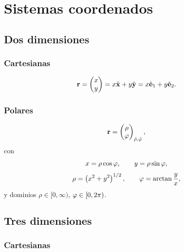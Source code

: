 \section{Sistemas coordenados}
\label{sec:sistemas_coordenados}

\subsection{Dos dimensiones}
\label{subsec:coordenadas_2d}

\subsubsection{Cartesianas}
\label{subsubsec:cartesianas_2d}

\begin{equation}
  \label{eq:cartesianas_2d}
  \mathbf{r}=
  \begin{pmatrix}
    x\\y
  \end{pmatrix}
  =x\hat{\mathbf{x}}+y\hat{\mathbf{y}}=x\hat{\mathbf{e}}_1+y\hat{\mathbf{e}}_2 .
\end{equation}

\subsubsection{Polares}
\label{subsubsec:polares}

\begin{equation}
  \label{eq:polares}
  \mathbf{r}=
  \begin{pmatrix}
    \rho\\\varphi
  \end{pmatrix}_{\hat{\mathbf{\rho}},\hat{\mathbf{\varphi}}},
\end{equation}
con
\begin{equation}
  \label{eq:polares_directa}
  x=\rho\cos\varphi,
  \qquad
  y=\rho\sin\varphi,
\end{equation}
\begin{equation}
  \label{eq:polares_inversa}
  \rho=\left( x^2+y^2 \right)^{1/2},
  \qquad
  \varphi=\arctan\frac{y}{x},
\end{equation}
y dominios $\rho\in[0,\infty)$, $\varphi\in[0,2\pi)$.

\subsection{Tres dimensiones}
\label{subsec:coordenadas_3d}

\subsubsection{Cartesianas}
\label{subsubsec:cartesianas_3d}

